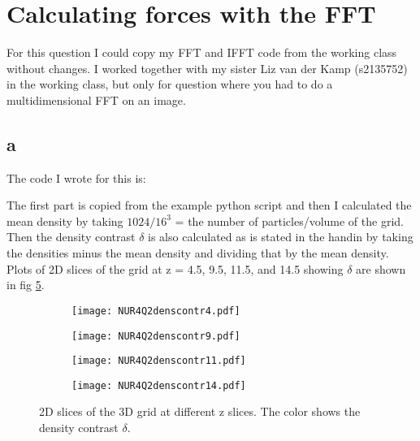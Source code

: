 \section{Calculating forces with the FFT}

For this question I could copy my FFT and IFFT code from the working class without changes. 
I worked together with my sister Liz van der Kamp (s2135752) in the working class, but only for question where you had to do a multidimensional FFT on an image. 

\subsection*{a}

The code I wrote for this is:


The first part is copied from the example python script and then I calculated the mean density by taking $1024/16^3$ = the number of particles/volume of the grid. Then the density contrast $\delta$ is also calculated as is stated in the handin by taking the densities minus the mean density and dividing that by the mean density. 
Plots of 2D slices of the grid at z = 4.5, 9.5, 11.5, and 14.5 showing $\delta$ are shown in fig \ref{fig:fig21}.

\begin{figure}[ht]
    \begin{subfigure}{.49\textwidth}
       \centering
    \texttt{[image: NUR4Q2denscontr4.pdf]}
    \centering
    \label{}
    \end{subfigure}
    \hfill
    \begin{subfigure}{.49\textwidth}
       \centering
    \texttt{[image: NUR4Q2denscontr9.pdf]}
    \centering
    \label{}
    \end{subfigure}
     \begin{subfigure}{.49\textwidth}
       \centering
    \texttt{[image: NUR4Q2denscontr11.pdf]}
    \centering
    \label{}
    \end{subfigure}
     \begin{subfigure}{.49\textwidth}
       \centering
    \texttt{[image: NUR4Q2denscontr14.pdf]}
    \centering
    \label{}
    \end{subfigure}
    \caption{2D slices of the 3D grid at different z slices. The color shows the density contrast $\delta$.}
    \label{fig:fig21}
\end{figure}

